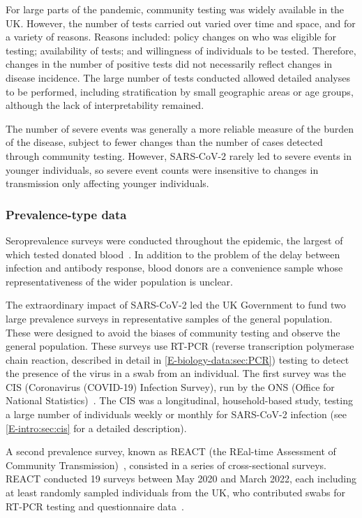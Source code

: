 \documentclass[thesis.tex]{subfiles}
\begin{document}
For large parts of the pandemic, community testing was widely available in the UK.
However, the number of tests carried out varied over time and space, and for a variety of reasons.
Reasons included: policy changes on who was eligible for testing; availability of tests; and willingness of individuals to be tested.
Therefore, changes in the number of positive tests did not necessarily reflect changes in disease incidence.
The large number of tests conducted allowed detailed analyses to be performed, including stratification by small geographic areas or age groups, although the lack of interpretability remained.

The number of severe events was generally a more reliable measure of the burden of the disease, subject to fewer changes than the number of cases detected through community testing.
However, SARS-CoV-2 rarely led to severe events in younger individuals, so severe event counts were insensitive to changes in transmission only affecting younger individuals.

\subsubsection{Prevalence-type data}

Seroprevalence surveys were conducted throughout the epidemic, the largest of which tested donated blood~\autocite{amirthalingamSeroprevalence}.
In addition to the problem of the delay between infection and antibody response, blood donors are a convenience sample whose representativeness of the wider population is unclear.

The extraordinary impact of SARS-CoV-2 led the UK Government to fund two large prevalence surveys in representative samples of the general population.
These were designed to avoid the biases of community testing and observe the general population.
These surveys use RT-PCR (reverse transcription polymerase chain reaction, described in detail in \cref{E-biology-data:sec:PCR}) testing to detect the presence of the virus in a swab from an individual.
The first survey was the CIS (Coronavirus (COVID-19) Infection Survey), run by the ONS (Office for National Statistics)~\autocite{CIS,cisMethodsONS}.
The CIS was a longitudinal, household-based study, testing a large number of individuals weekly or monthly for SARS-CoV-2 infection (see \cref{E-intro:sec:cis} for a detailed description).

A second prevalence survey, known as REACT (the REal-time Assessment of Community Transmission)~\autocite{rileyResurgence,rileyREACT}, consisted in a series of cross-sectional surveys.
REACT conducted 19 surveys between May 2020 and March 2022, each including at least  randomly sampled individuals from the UK, who contributed swabs for RT-PCR testing and questionnaire data~\autocite{elliottTwin}.
\end{document}
